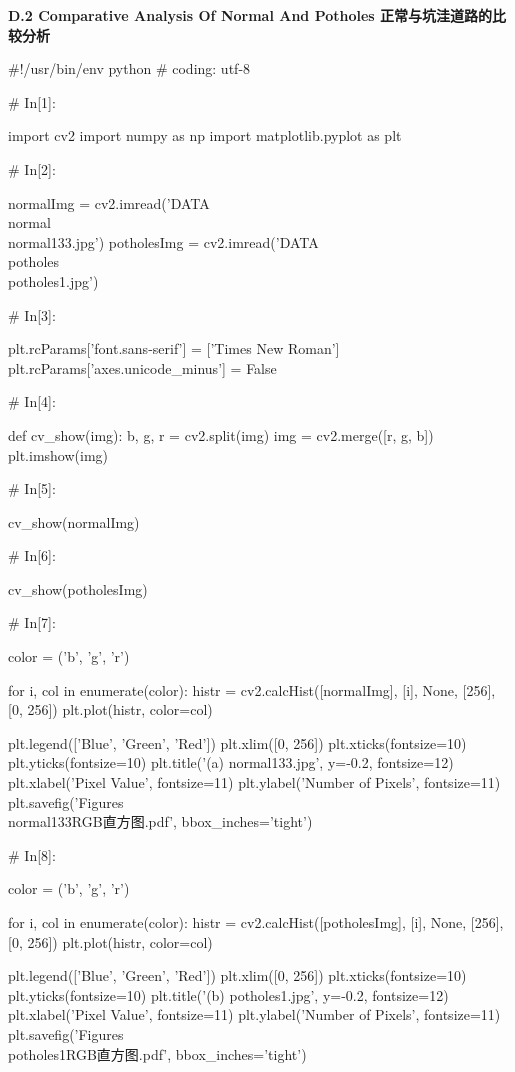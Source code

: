 \documentclass{MathorCupmodeling}
\begin{document}
\textbf{D.2 Comparative Analysis Of Normal And Potholes 正常与坑洼道路的比较分析}
\begin{python}
#!/usr/bin/env python
# coding: utf-8

# In[1]:


import cv2
import numpy as np
import matplotlib.pyplot as plt

# In[2]:


normalImg = cv2.imread('DATA\\normal\\normal133.jpg')
potholesImg = cv2.imread('DATA\\potholes\\potholes1.jpg')

# In[3]:


plt.rcParams['font.sans-serif'] = ['Times New Roman']
plt.rcParams['axes.unicode_minus'] = False


# In[4]:


def cv_show(img):
    b, g, r = cv2.split(img)
    img = cv2.merge([r, g, b])
    plt.imshow(img)


# In[5]:


cv_show(normalImg)

# In[6]:


cv_show(potholesImg)

# In[7]:


color = ('b', 'g', 'r')

for i, col in enumerate(color):
    histr = cv2.calcHist([normalImg], [i], None, [256], [0, 256])
    plt.plot(histr, color=col)

plt.legend(['Blue', 'Green', 'Red'])
plt.xlim([0, 256])
plt.xticks(fontsize=10)
plt.yticks(fontsize=10)
plt.title('(a) normal133.jpg', y=-0.2, fontsize=12)
plt.xlabel('Pixel Value', fontsize=11)
plt.ylabel('Number of Pixels', fontsize=11)
plt.savefig('Figures\\normal133RGB直方图.pdf', bbox_inches='tight')

# In[8]:


color = ('b', 'g', 'r')

for i, col in enumerate(color):
    histr = cv2.calcHist([potholesImg], [i], None, [256], [0, 256])
    plt.plot(histr, color=col)

plt.legend(['Blue', 'Green', 'Red'])
plt.xlim([0, 256])
plt.xticks(fontsize=10)
plt.yticks(fontsize=10)
plt.title('(b) potholes1.jpg', y=-0.2, fontsize=12)
plt.xlabel('Pixel Value', fontsize=11)
plt.ylabel('Number of Pixels', fontsize=11)
plt.savefig('Figures\\potholes1RGB直方图.pdf', bbox_inches='tight')


\end{python}
\end{document}
